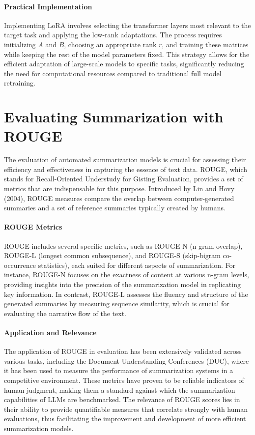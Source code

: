         \paragraph{Practical Implementation}
        Implementing LoRA involves selecting the transformer layers most relevant to the target task and applying the low-rank adaptations. The process requires initializing \(A\) and \(B\), choosing an appropriate rank \(r\), and training these matrices while keeping the rest of the model parameters fixed. This strategy allows for the efficient adaptation of large-scale models to specific tasks, significantly reducing the need for computational resources compared to traditional full model retraining.

\section{Evaluating Summarization with ROUGE}
    The evaluation of automated summarization models is crucial for assessing their efficiency and effectiveness in capturing the essence of text data. ROUGE, which stands for Recall-Oriented Understudy for Gisting Evaluation, provides a set of metrics that are indispensable for this purpose. Introduced by Lin and Hovy (2004), ROUGE measures compare the overlap between computer-generated summaries and a set of reference summaries typically created by humans.

    \paragraph{ROUGE Metrics}
    ROUGE includes several specific metrics, such as ROUGE-N (n-gram overlap), ROUGE-L (longest common subsequence), and ROUGE-S (skip-bigram co-occurrence statistics), each suited for different aspects of summarization. For instance, ROUGE-N focuses on the exactness of content at various n-gram levels, providing insights into the precision of the summarization model in replicating key information. In contrast, ROUGE-L assesses the fluency and structure of the generated summaries by measuring sequence similarity, which is crucial for evaluating the narrative flow of the text.

    \paragraph{Application and Relevance}
    The application of ROUGE in evaluation has been extensively validated across various tasks, including the Document Understanding Conferences (DUC), where it has been used to measure the performance of summarization systems in a competitive environment. These metrics have proven to be reliable indicators of human judgment, making them a standard against which the summarization capabilities of LLMs are benchmarked. The relevance of ROUGE scores lies in their ability to provide quantifiable measures that correlate strongly with human evaluations, thus facilitating the improvement and development of more efficient summarization models.

